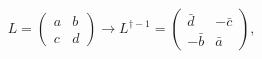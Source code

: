 \begin{equation}
L= \left(
\begin{array}{cc}
a & b\\
c & d
\end{array}
\right)  \longrightarrow L^{\dag-1}= \left(
\begin{array}{cc}
\bar{d} & -\bar{c}\\
-\bar{b} & \bar{a}
\end{array}
\right),
\end{equation}

